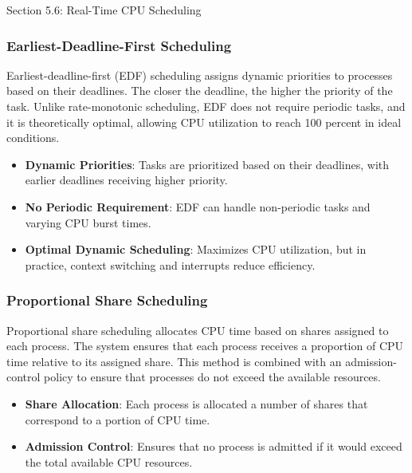 \begin{notes}{Section 5.6: Real-Time CPU Scheduling}
\begin{highlight}
    \end{highlight}
    
    \subsubsection*{Earliest-Deadline-First Scheduling}
    
    Earliest-deadline-first (EDF) scheduling assigns dynamic priorities to processes based on their deadlines. The closer the deadline, the higher the priority of the task. Unlike rate-monotonic scheduling, 
    EDF does not require periodic tasks, and it is theoretically optimal, allowing CPU utilization to reach 100 percent in ideal conditions.
    
    \begin{highlight}
    
        \begin{itemize}
            \item \textbf{Dynamic Priorities}: Tasks are prioritized based on their deadlines, with earlier deadlines receiving higher priority.
            \item \textbf{No Periodic Requirement}: EDF can handle non-periodic tasks and varying CPU burst times.
            \item \textbf{Optimal Dynamic Scheduling}: Maximizes CPU utilization, but in practice, context switching and interrupts reduce efficiency.
        \end{itemize}
    
    \end{highlight}
    
    \subsubsection*{Proportional Share Scheduling}
    
    Proportional share scheduling allocates CPU time based on shares assigned to each process. The system ensures that each process receives a proportion of CPU time relative to its assigned share. This 
    method is combined with an admission-control policy to ensure that processes do not exceed the available resources.
    
    \begin{highlight}
    
        \begin{itemize}
            \item \textbf{Share Allocation}: Each process is allocated a number of shares that correspond to a portion of CPU time.
            \item \textbf{Admission Control}: Ensures that no process is admitted if it would exceed the total available CPU resources.
        \end{itemize}
    

\end{highlight}
\end{notes}
